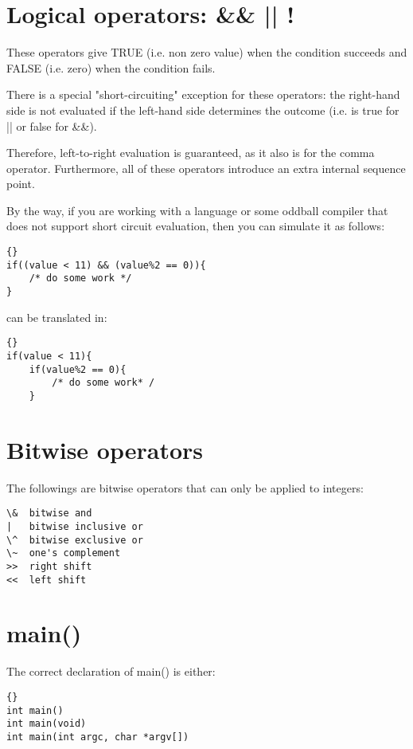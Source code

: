 \documentclass{report}
\begin{document}
\section{Logical operators: \&\& || !}
These operators give TRUE (i.e. non zero value) when the condition succeeds and FALSE (i.e. zero) when the condition fails.

There is a special "short-circuiting" exception for these operators: the right-hand side is not evaluated if the left-hand side determines the outcome (i.e. is true for || or false for \&\&).

Therefore, left-to-right evaluation is guaranteed, as it also is for the comma operator. Furthermore, all of these operators introduce an extra internal sequence point.

By the way, if you are working with a language or some oddball compiler that does not support short circuit evaluation, then you can simulate it as follows:
\begin{lstlisting}{}
if((value < 11) && (value%2 == 0)){
    /* do some work */
}
\end{lstlisting}
can be translated in:
\begin{lstlisting}{}
if(value < 11){
    if(value%2 == 0){
        /* do some work* /
    }
\end{lstlisting}

\section{Bitwise operators}
The followings are bitwise operators that can only be applied to integers:
\begin{verbatim}
\&  bitwise and
|   bitwise inclusive or
\^  bitwise exclusive or
\~  one's complement
>>  right shift
<<  left shift
\end{verbatim}

\section{main()}
The correct declaration of main() is either:
\begin{lstlisting}{}
int main()
int main(void)
int main(int argc, char *argv[])
\end{lstlisting}
	
\end{document}
